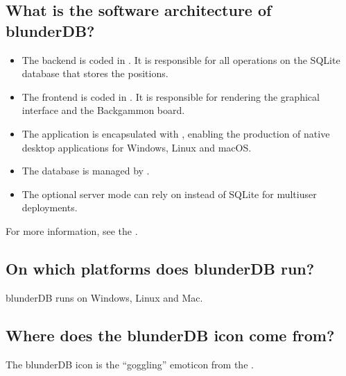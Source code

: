 \documentclass[letterpaper,10pt,english]{sphinxmanual}
\begin{document}
\subsection{What is the software architecture of blunderDB?}
\label{\detokenize{faq:quel-est-l-architecture-logicielle-de-blunderdb}}\begin{itemize}
\item {} 
\sphinxAtStartPar
The backend is coded in . It is responsible for all operations on the SQLite database that stores the positions.

\item {} 
\sphinxAtStartPar
The frontend is coded in . It is responsible for rendering the graphical interface and the Backgammon board.

\item {} 
\sphinxAtStartPar
The application is encapsulated with , enabling the production of native desktop applications for Windows, Linux and macOS.

\item {} 
\sphinxAtStartPar
The database is managed by .

\item {} 
\sphinxAtStartPar
The optional server mode can rely on  instead of SQLite for multi\sphinxhyphen{}user deployments.

\end{itemize}

\sphinxAtStartPar
For more information, see the .


\subsection{On which platforms does blunderDB run?}
\label{\detokenize{faq:sur-quelles-plateformes-blunderdb-fonctionne-t-il}}
\sphinxAtStartPar
blunderDB runs on Windows, Linux and Mac.


\subsection{Where does the blunderDB icon come from?}
\label{\detokenize{faq:d-ou-vient-l-icone-de-blunderdb}}
\sphinxAtStartPar
The blunderDB icon is the “goggling” emoticon from the  .
\end{document}

